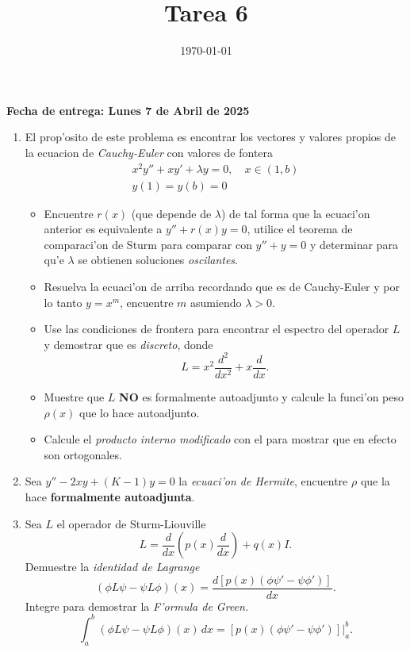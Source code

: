 \documentclass[letterpaper]{article}
\date{\today}
\title{Tarea 6}
\begin{document}
\maketitle

\textbf{Fecha de entrega: Lunes 7 de Abril de 2025}

\begin{enumerate}
  \item El prop'osito de este problema es encontrar los vectores y valores propios de la ecuacion de \emph{Cauchy-Euler} con valores de fontera
        \begin{align*}
          x^{2}y''+xy'+\lambda y=0,\quad x\in(1,b)\\
          y(1)=y(b)=0
        \end{align*}
        \begin{itemize}
          \item Encuentre $r(x)$ (que depende de $\lambda$) de tal forma que la ecuaci'on anterior es equivalente a $y''+r(x)y=0$, utilice el teorema de comparaci'on de Sturm para comparar con $y''+y=0$ y determinar para qu'e $\lambda$ se obtienen soluciones \emph{oscilantes}.
          \item Resuelva la ecuaci'on de arriba recordando que es de Cauchy-Euler y por lo tanto $y=x^{m}$, encuentre $m$ asumiendo $\lambda>0$.
          \item Use las condiciones de frontera para encontrar el espectro del operador $L$ y demostrar que es \emph{discreto}, donde
                \[
                L=x^{2}\dfrac{d^{2}}{dx^{2}}+x\dfrac{d}{dx}.
                \]
          \item Muestre que $L$ \textbf{NO} es formalmente autoadjunto y calcule la funci'on peso $\rho(x)$ que lo hace autoadjunto.
          \item Calcule el \emph{producto interno modificado} con el para mostrar que en efecto son ortogonales.
        \end{itemize}
  \item Sea $y''-2xy+(K-1)y=0$ la \emph{ecuaci'on de Hermite}, encuentre $\rho$ que la hace \textbf{formalmente autoadjunta}.

  \item Sea $L$ el operador de Sturm-Liouville
        \[
       L=\frac{d}{dx} \left( p(x) \dfrac{d}{dx} \right) + q(x)I.
        \]
        \noindent Demuestre la \emph{identidad de Lagrange}
        \[
        (\phi L\psi-\psi L\phi)(x)=\dfrac{d [p(x)(\phi\psi'-\psi\phi')]}{dx}.
        \]
        \noindent Integre para demostrar la \emph{F'ormula de Green.}
        \[
        \int_{a}^{b}(\phi L\psi-\psi L\phi)(x)\,dx=[p(x)(\phi\psi'-\psi\phi')]|_{a}^{b}.
        \]
\end{enumerate}
\end{document}
